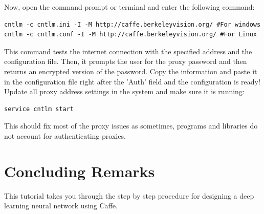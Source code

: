 \documentclass{article}
\begin{document}
Now, open the command prompt or terminal and enter the following command:
\begin{lstlisting}
cntlm -c cntlm.ini -I -M http://caffe.berkeleyvision.org/ #For windows
cntlm -c cntlm.conf -I -M http://caffe.berkeleyvision.org/ #For Linux
\end{lstlisting}
This command tests the internet connection with the specified address and the configuration file. Then, it prompts the user for the proxy password and then returns an encrypted version of the password. Copy the information and paste it in the configuration file right after the 'Auth' field and the configuration is ready! Update all proxy address settings in the system and make sure it is running:
\begin{verbatim}
service cntlm start
\end{verbatim}

This should fix most of the proxy issues as sometimes, programs and libraries do not account for authenticating proxies.

\section*{Concluding Remarks}
This tutorial takes you through the step by step procedure for designing a deep learning neural network using Caffe.



\end{document}
